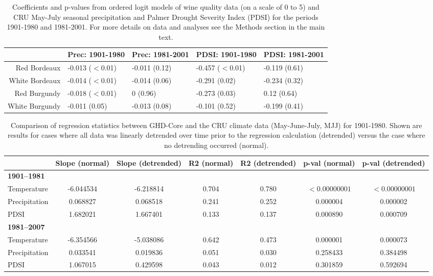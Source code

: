 \documentclass[12pt]{article}
\begin{document}
\begin{table}
\centering
\caption{Coefficients and p-values from  ordered logit models of wine quality data (on a scale of 0 to 5) and CRU May-July seasonal precipitation and Palmer Drought Severity Index (PDSI) for the periods 1901-1980 and 1981-2001. For more details on data and analyses see the Methods section in the main text.} 
\begin{tabular}{|r||l|l||l|l|}
  \hline
 & Prec: 1901-1980 & Prec: 1981-2001 & PDSI: 1901-1980 & PDSI: 1981-2001 \\ 
  \hline
Red Bordeaux & -0.013 ($<$0.01) & -0.011 (0.12) & -0.457 ($<$0.01) & -0.119 (0.61) \\ 
  White Bordeaux & -0.014 ($<$0.01) & -0.014 (0.06) & -0.291 (0.02) & -0.234 (0.32) \\ 
  Red Burgundy & -0.018 ($<$0.01) & 0 (0.96) & -0.273 (0.03) & 0.12 (0.64) \\ 
  White Burgundy & -0.011 (0.05) & -0.013 (0.08) & -0.101 (0.52) & -0.199 (0.41) \\ 
   \hline
\end{tabular}
\end{table}

\begin{table}
\small
\caption{\small Comparison of regression statistics between GHD-Core and the CRU climate data (May-June-July, MJJ) for 1901-1980. Shown are results for cases where all data was linearly detrended over time prior to the regression calculation (detrended) versus the case where no detrending occurred (normal).}
\centering
\begin{tabular}{l c c c c c c}
\hline
& \bf Slope (normal) & \bf Slope (detrended) & \bf R2 (normal) & \bf R2 (detrended) & \bf p-val (normal) & \bf p-val (detrended)\\
\hline
\bf 1901--1981 & &  &  & & & \\
Temperature & -6.044534 & -6.218814	& 0.704 & 0.780 & $<0.00000001$ & $<0.00000001$\\
Precipitation & 0.068827  & 0.068518    & 0.241 & 0.252 & 0.000004 & 0.000002\\
PDSI & 1.682021  & 1.667401   & 0.133 & 0.137 & 0.000890 & 0.000709\\
\hline
\bf 1981--2007 & &  &  & & & \\
Temperature & -6.354566 & -5.038086	& 0.642	 & 0.473 & 0.000001 & 0.000073\\
Precipitation & 0.033541 & 0.019836  & 0.051 & 0.030 & 0.258433 & 0.384498\\
PDSI & 1.067015 & 0.429598   & 0.043	 & 0.012 & 0.301859 & 0.592694\\
\hline
\end{tabular}
\end{table}
\end{document}
